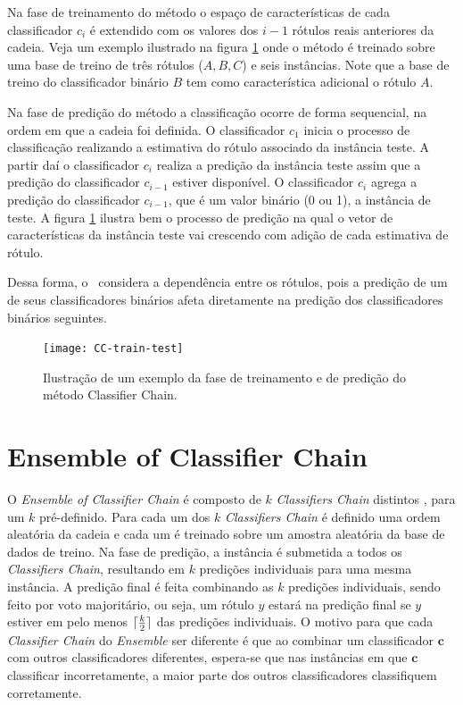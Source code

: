 Na fase de treinamento do método o espaço de características de cada classificador $c_i$ é 
extendido com os valores dos $i-1$ rótulos reais anteriores da cadeia. Veja um exemplo 
ilustrado na figura \ref{fig:CCtraintest} onde o método é treinado sobre uma base de treino de três rótulos ($A,B,C$)
e seis instâncias. Note que a base de treino do classificador binário $B$ tem como característica adicional o rótulo $A$.

Na fase de predição do método a classificação ocorre de forma sequencial, na ordem em que a cadeia foi definida.
O classificador $c_1$ inicia o processo de classificação realizando a estimativa do rótulo associado da instância teste.
A partir daí o classificador $c_i$ realiza a predição da instância teste assim que a predição do classificador $c_{i-1}$
estiver disponível. O classificador $c_i$ agrega a predição do classificador $c_{i-1}$, que é um valor binário (0 ou 1),
a instância de teste. A figura \ref{fig:CCtraintest} ilustra bem o processo de predição na qual o vetor de características da
instância teste vai crescendo com adição de cada estimativa de rótulo.

Dessa forma, o \CC~considera a dependência entre os rótulos, pois a predição de um de seus classificadores binários
afeta diretamente na predição dos classificadores binários seguintes.

\begin{figure}

 \texttt{[image: CC-train-test]}
 \caption{Ilustração de um exemplo da fase de treinamento e de predição do método Classifier Chain.}
\label{fig:CCtraintest}
\end{figure}


\section{Ensemble of Classifier Chain}
O \textit{Ensemble of Classifier Chain} é composto de $k$ \textit{Classifiers Chain} distintos \cite{cc2009},
para um $k$ pré-definido.
Para cada um dos $k$ \textit{Classifiers Chain} é definido uma ordem aleatória da cadeia e
cada um é treinado sobre um amostra aleatória da base de dados de treino.
Na fase de predição, a instância é submetida a todos os \textit{Classifiers Chain}, resultando
em $k$ predições individuais para uma mesma instância. A predição final é feita combinando 
as $k$ predições individuais,
sendo feito por voto majoritário, ou seja, um rótulo $y$ estará na predição final se $y$ estiver
em pelo menos $\lceil\frac{k}{2}\rceil$ das predições individuais.
O motivo para que cada \textit{Classifier Chain} do \textit{Ensemble} ser diferente é que
ao combinar um classificador $\textbf{c}$ com outros classificadores diferentes,
espera-se que nas instâncias em que $\textbf{c}$ classificar incorretamente,
a maior parte dos outros classificadores classifiquem corretamente.


